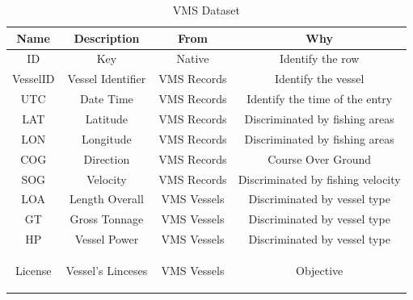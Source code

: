 \begin {table}[H]
\begin{center}
\begin{tabular}{c|c|c|c}
\textbf{Name }    & \textbf{Description} & \textbf{From} & \textbf{Why} \\
\hline
ID                & Key              & Native               & Identify the row           \\
VesselID          & Vessel Identifier   & VMS Records                & Identify the vessel  \\
UTC         & Date Time & VMS Records &Identify the time of the entry\\
LAT        & Latitude & VMS Records & Discriminated by fishing areas\\
LON        & Longitude & VMS Records & Discriminated by fishing areas\\
COG        & Direction & VMS Records & Course Over Ground\\
SOG        & Velocity & VMS Records & Discriminated by fishing velocity\\
LOA        & Length Overall & VMS Vessels & Discriminated by vessel type\\
GT        &  Gross Tonnage & VMS Vessels & Discriminated by vessel type\\
HP         &Vessel Power & VMS Vessels & Discriminated by vessel type\\
License        & Vessel's Linceses & VMS Vessels & Objective
           
\label{table:vms_dataset}
\end{tabular}
\caption {VMS Dataset}
\end{center}
\end {table}




